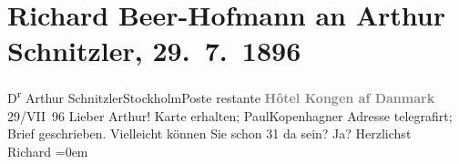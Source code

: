 

         
         \renewcommand{\erwaehntePersonen}{Personen: Paul Goldmann}
         \renewcommand{\erwaehnteOrte}{Orte: Hotel König von Dänemark, Kopenhagen, Stockholm}
         \renewcommand{\erwaehnteWerke}{}
               \section[Richard Beer-Hofmann an Arthur Schnitzler, 29. 7. 1896]{ Richard Beer-Hofmann an Arthur Schnitzler,
               29. 7. 1896}\nopagebreak{}\rehead{ }\begin{ledgroupsized}[t]{13cm}\normalsize\beginnumbering \toendnotes[C]{\smallbreak\pagebreak[2]} 
\pstart{}{\pb}D\textsuperscript{r}
                  Arthur Schnitzler\pend{}\pstart{}Stockholm\pend{}\pstart{}Poste restante\pend{}{\bigskip}\pstart
           \noindent{}\centering{}\textcolor{gray}{\textbf{{\pb}Hôtel Kongen af Danmark}}\pend
           \pstart
           \raggedleft{}{\pb}29/VII 96\pend
           \pstart{}Lieber Arthur!\pend\pstart
           Karte erhalten; PaulKopenhagner Adresse telegrafirt; Brief
               geschrieben. Vielleicht können Sie schon 31 da sein? Ja?\pend
           \pstart
           Herzlichst{\\[\baselineskip]}\spacefill\mbox{Richard}\pend
           \leftskip=0em{}
         
         \endnumbering{}\end{ledgroupsized}  \newcommand{\dateiname}{L00572}\newcommand{\titel}{Richard Beer-Hofmann an Arthur Schnitzler, 29. 7. 1896}\newcommand{\editorInnen}{Martin Anton Müller und Gerd-Hermann Susen}
      